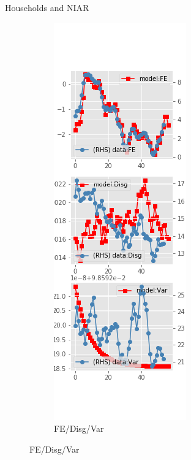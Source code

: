 \documentclass{beamer}
\begin{document}
\begin{frame}{Households and NIAR}
\begin{figure}[ht]
\begin{subfigure}[b]{0.2\textwidth}
		\end{subfigure}
		\hfill
		\begin{subfigure}[b]{0.2\textwidth}
			\caption{FE/Disg/Var}
			\includegraphics[width=\textwidth, height = 0.8\textheight]{figuresDraft/sce_ni_est_diag2.png}
		\end{subfigure}
		\end{figure}
\end{frame}
\end{document}
